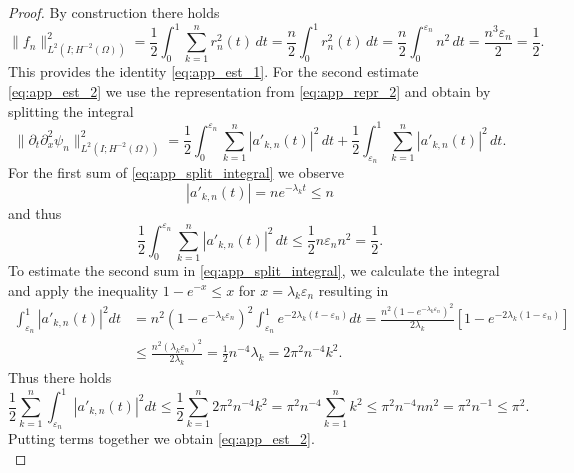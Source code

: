 \documentclass{m2an}
\newcommand{\1}{\mathds{1}}
\theoremstyle{definition}
\begin{document}
\begin{proof}
By construction there holds
\[
\|f_n\|^2_{L^2(I;H^{-2}(\Omega))} = \frac{1}{2} \int_0^1 \sum_{k=1}^n r_n^2(t)\, dt = \frac{n}{2} \int_0^1 r_n^2(t)\, dt = \frac{n}{2} \int_0^{\varepsilon_n} n^2 \,dt = \frac{n^3 \varepsilon_n}{2} = \frac{1}{2}.
\]
This provides the identity \eqref{eq:app_est_1}. For the second estimate \eqref{eq:app_est_2} we 
use the representation from \eqref{eq:app_repr_2} and obtain by splitting the integral
\begin{equation}\label{eq:app_split_integral}
\|\partial_t \partial^2_x \psi_n\|^2_{L^2(I;H^{-2}(\Omega))} =  \frac12\int_0^{\varepsilon_n} \sum_{k=1}^n |a'_{k,n}(t)|^2\,dt + \frac12\int_{\varepsilon_n}^1 \sum_{k=1}^n |a'_{k,n}(t)|^2\,dt.
\end{equation}
For the first sum of \eqref{eq:app_split_integral} we observe
\[
 |a'_{k,n}(t)| = n e^{-\lambda_k t} \le n
\]
and thus
\[
\frac12\int_0^{\varepsilon_n} \sum_{k=1}^n |a'_{k,n}(t)|^2\,dt \le \frac12 n \varepsilon_n n^2 = \frac12.
\]
To estimate the second sum in \eqref{eq:app_split_integral}, we calculate the integral and apply the inequality $1-e^{-x} \le x $ for $x=\lambda_k \varepsilon _n$ resulting in 
  \begin{align*}
	\int_{\varepsilon_n}^1 |a'_{k,n}(t)|^2 dt
	& =n^2(1-e^{-\lambda_k \varepsilon_n})^2 \int_{\varepsilon_n}^1 e^{-2\lambda_k(t-\varepsilon_n)} dt
	= \frac{n^2(1-e^{-\lambda_k \varepsilon_n})^2}{2 \lambda_k} [1 - e^{-2\lambda_k(1-\varepsilon_n)}]\\
	& \le \frac{n^2(\lambda_k \varepsilon_n)^2}{2 \lambda_k} = \frac12 n^{-4} \lambda_k = 2 \pi^2 n^{-4} k^2.
\end{align*}
Thus there holds 
\begin{equation*}
	\frac12 \sum_{k=1}^n \int_{\varepsilon_n}^1 |a'_{k,n}(t)|^2 dt \le \frac12 \sum_{k=1}^n 2 \pi^2 n^{-4} k^2
	= \pi^2 n^{-4} \sum_{k=1}^n k^2 \le \pi^2 n^{-4} n n^2 = \pi^2 n^{-1} \le \pi^2.
\end{equation*}
Putting terms together we obtain \eqref{eq:app_est_2}.\\


\end{proof}
\end{document}
